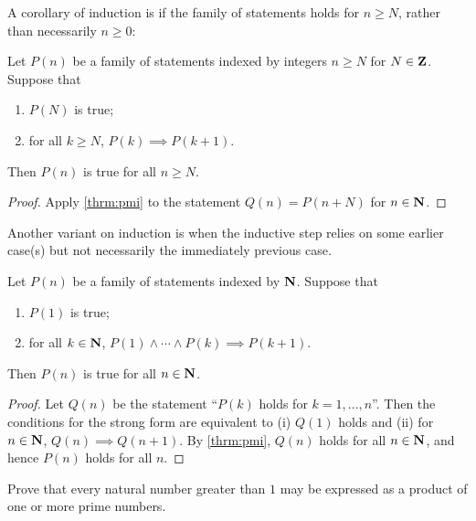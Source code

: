A corollary of induction is if the family of statements holds for $n\ge N$, rather than necessarily $n\ge0$:

\begin{corollary}
Let $P(n)$ be a family of statements indexed by integers $n \ge N$ for $N\in\mathbf Z$. Suppose that 
\begin{enumerate}[label=(\roman*)]
\item $P(N)$ is true;
\item for all $k \ge N$, $P(k) \implies P(k+1)$. 
\end{enumerate}
Then $P(n)$ is true for all $n \ge N$.
\end{corollary}

\begin{proof}
Apply \cref{thrm:pmi} to the statement $Q(n)=P(n+N)$ for $n\in\mathbf N$.
\end{proof}

Another variant on induction is when the inductive step relies on some earlier case(s) but not necessarily the immediately previous case.

\begin{theorem}\label{thrm:strong-induction}
Let $P(n)$ be a family of statements indexed by $\mathbf N$. Suppose that
\begin{enumerate}[label=(\roman*)]
\item $P(1)$ is true;
\item for all $k\in\mathbf N$, $P(1)\land\cdots\land P(k)\implies P(k+1)$.
\end{enumerate}
Then $P(n)$ is true for all $n\in\mathbf N$.
\end{theorem}

\begin{proof}
Let $Q(n)$ be the statement ``$P(k)$ holds for $k=1,\dots,n$''. Then the conditions for the strong form are equivalent to (i) $Q(1)$ holds and (ii) for $n\in\mathbf N$, $Q(n)\implies Q(n+1)$. By \cref{thrm:pmi}, $Q(n)$ holds for all $n\in\mathbf N$, and hence $P(n)$ holds for all $n$.
\end{proof}

\begin{exercise}
Prove that every natural number greater than $1$ may be expressed as a product of one or more prime numbers.
\end{exercise}

